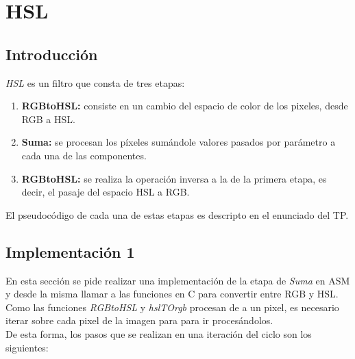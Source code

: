 \section{HSL}
\subsection{Introducción}
\textit{HSL} es un filtro que consta de tres etapas:
\begin{enumerate}
\item \textbf{RGBtoHSL:} consiste en un cambio del espacio de color de los pixeles, desde RGB a HSL. 
\item \textbf{Suma:} se procesan los píxeles sumándole valores pasados por parámetro a cada una de las componentes.
\item \textbf{RGBtoHSL:} se realiza la operación inversa a la de la primera etapa, es decir, el pasaje del espacio HSL a RGB.
\end{enumerate}

El pseudocódigo de cada una de estas etapas es descripto en el enunciado del TP.

\subsection{Implementación 1}
En esta sección se pide realizar una implementación de la etapa de \textit{Suma} en ASM y desde la misma llamar a las funciones en C para convertir entre RGB y HSL.\\
Como las funciones \textit{RGBtoHSL} y \textit{hslTOrgb} procesan de a un pixel, es necesario iterar sobre cada pixel de la imagen para para ir procesándolos.\\

De esta forma, los pasos que se realizan en una iteración del ciclo son los siguientes:

